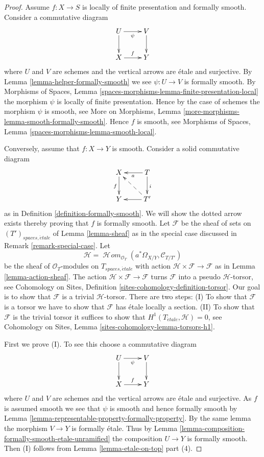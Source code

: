 \documentclass[10pt,a4paper]{amsart}
\theoremstyle{plain}
\theoremstyle{definition}
\theoremstyle{remark}
\numberwithin{equation}{subsection}
\def\SheafHom{\mathop{\mathcal{H}\!\mathit{om}}\nolimits}
\def\etale{{\acute{e}tale}}
\begin{document}
\begin{proof}
Assume $f : X \to S$ is locally of finite presentation and formally smooth.
Consider a commutative diagram
$$
\xymatrix{
U \ar[d] \ar[r]_\psi & V \ar[d] \\
X \ar[r]^f & Y
}
$$
where $U$ and $V$ are schemes and the vertical arrows are \'etale and
surjective. By
Lemma \ref{lemma-helper-formally-smooth}
we see $\psi : U \to V$ is formally smooth. By
Morphisms of Spaces, Lemma
\ref{spaces-morphisms-lemma-finite-presentation-local}
the morphism $\psi$ is locally of finite presentation.
Hence by the case of schemes the morphism
$\psi$ is smooth, see
More on Morphisms, Lemma \ref{more-morphisms-lemma-smooth-formally-smooth}.
Hence $f$ is smooth, see
Morphisms of Spaces, Lemma
\ref{spaces-morphisms-lemma-smooth-local}.

\medskip\noindent
Conversely, assume that $f : X \to Y$ is smooth.
Consider a solid commutative diagram
$$
\xymatrix{
X \ar[d]_f & T \ar[d]^i \ar[l]^a \\
Y & T' \ar[l] \ar@{-->}[lu]
}
$$
as in Definition \ref{definition-formally-smooth}. We will show the
dotted arrow exists thereby proving that $f$ is formally smooth.
Let $\mathcal{F}$ be the sheaf of sets on $(T')_{spaces, \etale}$ of
Lemma \ref{lemma-sheaf} as in the special case discussed in
Remark \ref{remark-special-case}. Let
$$
\mathcal{H} =
\SheafHom_{\mathcal{O}_T}(a^*\Omega_{X/Y}, \mathcal{C}_{T/T'})
$$
be the sheaf of $\mathcal{O}_T$-modules on $T_{spaces, \etale}$
with action $\mathcal{H} \times \mathcal{F} \to \mathcal{F}$
as in Lemma \ref{lemma-action-sheaf}.
The action $\mathcal{H} \times \mathcal{F} \to \mathcal{F}$
turns $\mathcal{F}$ into a pseudo $\mathcal{H}$-torsor, see
Cohomology on Sites, Definition \ref{sites-cohomology-definition-torsor}.
Our goal is to show that $\mathcal{F}$ is a trivial $\mathcal{H}$-torsor.
There are two steps: (I) To show that $\mathcal{F}$ is a torsor
we have to show that $\mathcal{F}$ has \'etale locally a
section. (II) To show that $\mathcal{F}$ is the trivial torsor
it suffices to show that $H^1(T_\etale, \mathcal{H}) = 0$, see
Cohomology on Sites, Lemma \ref{sites-cohomology-lemma-torsors-h1}.

\medskip\noindent
First we prove (I). To see this choose a commutative diagram
$$
\xymatrix{
U \ar[d] \ar[r]_\psi & V \ar[d] \\
X \ar[r]^f & Y
}
$$
where $U$ and $V$ are schemes and the vertical arrows are \'etale and
surjective. As $f$ is assumed smooth we see that $\psi$ is smooth and
hence formally smooth by
Lemma \ref{lemma-representable-property-formally-property}.
By the same lemma the morphism $V \to Y$ is formally \'etale. Thus by
Lemma \ref{lemma-composition-formally-smooth-etale-unramified}
the composition $U \to Y$ is formally smooth. Then (I) follows from
Lemma \ref{lemma-etale-on-top} part (4).


\end{proof}
\end{document}
